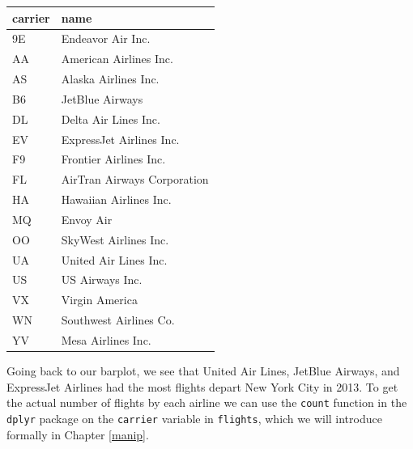 \documentclass[]{tufte-book}
\newenvironment{Shaded}{\begin{snugshade}}{\end{snugshade}}
\newcommand{\KeywordTok}[1]{\textcolor[rgb]{0.13,0.29,0.53}{\textbf{{#1}}}}
\newcommand{\StringTok}[1]{\textcolor[rgb]{0.31,0.60,0.02}{{#1}}}
\newcommand{\NormalTok}[1]{{#1}}
\begin{document}
\begin{tabular}{l|l}
\hline
carrier & name\\
\hline
9E & Endeavor Air Inc.\\
\hline
AA & American Airlines Inc.\\
\hline
AS & Alaska Airlines Inc.\\
\hline
B6 & JetBlue Airways\\
\hline
DL & Delta Air Lines Inc.\\
\hline
EV & ExpressJet Airlines Inc.\\
\hline
F9 & Frontier Airlines Inc.\\
\hline
FL & AirTran Airways Corporation\\
\hline
HA & Hawaiian Airlines Inc.\\
\hline
MQ & Envoy Air\\
\hline
OO & SkyWest Airlines Inc.\\
\hline
UA & United Air Lines Inc.\\
\hline
US & US Airways Inc.\\
\hline
VX & Virgin America\\
\hline
WN & Southwest Airlines Co.\\
\hline
YV & Mesa Airlines Inc.\\
\hline
\end{tabular}

Going back to our barplot, we see that United Air Lines, JetBlue
Airways, and ExpressJet Airlines had the most flights depart New York
City in 2013. To get the actual number of flights by each airline we can
use the \texttt{count} function in the \texttt{dplyr} package on the
\texttt{carrier} variable in \texttt{flights}, which we will introduce
formally in Chapter \ref{manip}.

\begin{Shaded}
\end{Shaded}
\end{document}
